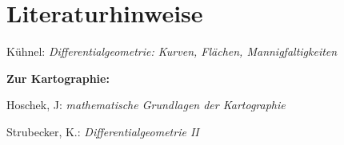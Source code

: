 \chapter{Literaturhinweise}

Kühnel: \textit{Differentialgeometrie: Kurven, Flächen, Mannigfaltigkeiten}

\textbf{Zur Kartographie:}\par
Hoschek, J: \textit{mathematische Grundlagen der Kartographie} \par
Strubecker, K.: \textit{Differentialgeometrie II}
